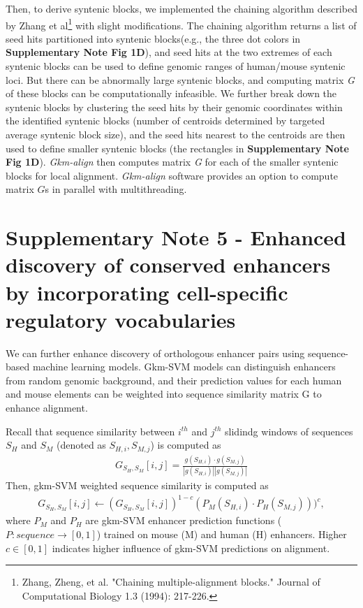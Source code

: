 \documentclass[english]{article}
\begin{document}
Then, to derive syntenic blocks, we implemented the chaining algorithm described by Zhang et al\footnote{Zhang, Zheng, et al. "Chaining multiple-alignment blocks." Journal of Computational Biology 1.3 (1994): 217-226.} with slight modifications. The chaining algorithm returns a list of seed hits partitioned into syntenic blocks(e.g., the three dot colors in \textbf{Supplementary Note Fig 1D}), and seed hits at the two extremes of each syntenic blocks can be used to define genomic ranges of human/mouse syntenic loci. But there can be abnormally large syntenic blocks, and computing matrix \textit{G} of these blocks can be computationally infeasible. We further break down the syntenic blocks by clustering the seed hits by their genomic coordinates within the identified syntenic blocks (number of centroids determined by targeted average syntenic block size), and the seed hits nearest to the centroids are then used to define smaller syntenic blocks (the rectangles in \textbf{Supplementary Note Fig 1D}). \textit{Gkm-align} then computes matrix \textit{G} for each of the smaller syntenic blocks for local alignment. \textit{Gkm-align} software provides an option to compute matrix $G$s in parallel with multithreading. 

\section{Supplementary Note 5 - Enhanced discovery of conserved enhancers by incorporating cell-specific regulatory vocabularies}

 We can further enhance discovery of orthologous enhancer pairs using sequence-based machine learning models. Gkm-SVM models can distinguish enhancers from random genomic background, and their prediction values for each human and mouse elements can be weighted into sequence similarity matrix G to enhance alignment. 

 Recall that sequence similarity between $i^{th}$ and $j^{th}$ slidindg windows of sequences $S_H$ and $S_M$ (denoted as $S_{H,i}, S_{M,j}$) is computed as 
\begin{align*}
    G_{S_H,S_M} [i,j] = \frac{g(S_{H,i}) \cdot g(S_{M,j})}{|g(S_{H,i})||g(S_{M,j})|}
\end{align*}
Then, gkm-SVM weighted sequence similarity is computed as 
\begin{align*}
    G_{S_H, S_M} [i,j] \leftarrow (G_{S_H, S_M}[i,j])^{1-c}(P_{M}(S_{H,i})\cdot P_{H}(S_{M,j})))^c,
\end{align*}
where $P_{M}$ and $P_{H}$ are  gkm-SVM enhancer prediction functions ($P: sequence \rightarrow [0,1]$) trained on mouse (M) and human (H) enhancers. Higher $c\in [0,1]$ indicates higher influence of gkm-SVM predictions on alignment. \\
\end{document}

